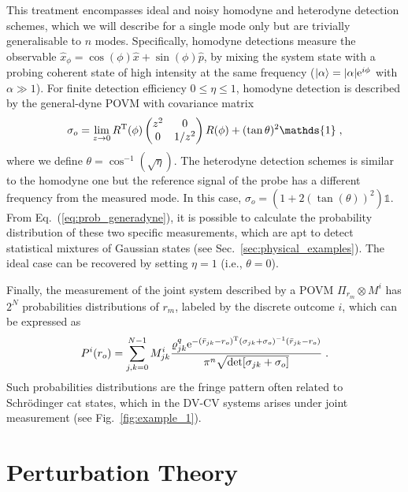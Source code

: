 \documentclass[%
reprint,
superscriptaddress,
nofootinbib,
 amsmath,amssymb,
prx,
floatfix,
]{revtex4-2}
\begin{document}
This treatment encompasses ideal and noisy homodyne and heterodyne detection schemes, which we will describe for a single mode only but are trivially generalisable to $n$ modes. Specifically, homodyne detections measure the observable $\hat{x}_{\phi} = \cos (\phi) \hat{x} + \sin(\phi) \hat{p}$, by mixing the system state with a probing coherent state of high intensity at the same frequency ($\ket{\alpha} = |\alpha| {\rm e}^{i \phi}$ with $\alpha \gg 1$). For finite detection efficiency $0 \leq \eta \leq 1$, homodyne detection is described by the general-dyne POVM with covariance matrix 
\begin{equation}
\label{eq:homodyne}
    \sigma_o = \lim_{z \to 0} R^{\rm T} (\phi) \begin{pmatrix}
        z^{2} & 0  \\
        0 & 1/z^2 
    \end{pmatrix} R (\phi) + (\tan \theta)^2 \mathds{1} \;,
\end{equation}
where we define $\theta = \cos^{-1}(\sqrt{\eta})$. The heterodyne detection schemes is similar to the homodyne one but the reference signal of the probe has a different frequency from the measured mode. In this case, $\sigma_o = (1 + 2( \tan(\theta))^2) \mathds{1}$. From Eq.~(\ref{eq:prob_generadyne}), it is possible to calculate the probability distribution of these two specific measurements, which are  apt to detect statistical mixtures of Gaussian states (see Sec.~\ref{sec:physical_examples}). The ideal case can be recovered by setting $\eta = 1$ (i.e., $\theta =0$).


Finally, the measurement of the joint system described by a POVM $\Pi_{r_m} \otimes M^i$ has $2^N$ probabilities distributions of $r_m$, labeled by the discrete outcome $i$, which can be expressed as
\begin{equation}
    P^{i}(r_o) = \sum_{j, k  = 0}^{N-1} M^{i}_{jk} \frac{\varrho^q_{jk} {\rm e}^{ - (\bar{r}_{jk} - r_o)^{\rm T} ( \sigma_{jk} + \sigma_o )^{-1}  (\bar{r}_{jk} - r_o) }}{\pi^n  \sqrt{ \text{det} [ \sigma_{jk} + \sigma_o ] }}\; . \nonumber
\end{equation}
Such probabilities distributions are the fringe pattern often related to Schr\"odinger cat states, which in the DV-CV systems arises under joint measurement (see Fig.~\ref{fig:example_1}). 




\section{Perturbation Theory \label{sec:perturbation}}
\end{document}
